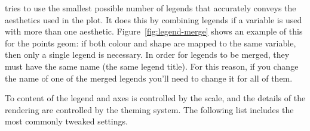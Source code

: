 % 


\ggplot tries to use the smallest possible number of legends that accurately conveys the aesthetics used in the plot.  It does this by combining legends if a variable is used with more than one aesthetic.  Figure~\ref{fig:legend-merge} shows an example of this for the points geom: if both colour and shape are mapped to the same variable, then only a single legend is necessary.  In order for legends to be merged, they must have the same name (the same legend title).  For this reason, if you change the name of one of the merged legends you'll need to change it for all of them.

% 


To content of the legend and axes is controlled by the scale, and the details of the rendering are controlled by the theming system.  The following list includes the most commonly tweaked settings.

